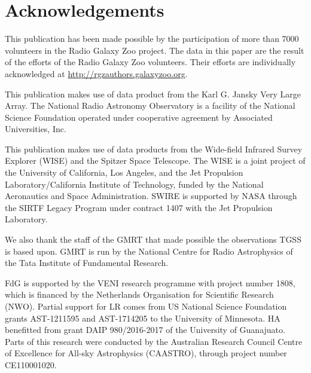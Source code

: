 \documentclass[fleqn,usenatbib]{mnras}
\begin{document}





\section*{Acknowledgements}

This publication has been made possible by the participation of more than 7000 volunteers in the Radio Galaxy Zoo project.  The data in this paper are the result of the efforts of
the Radio Galaxy Zoo volunteers.
Their efforts are individually acknowledged at {\url{http://rgzauthors.galaxyzoo.org}}. 


This publication makes use of data product from the Karl G. Jansky Very Large Array. The National Radio Astronomy Observatory is a facility of the National Science Foundation operated under cooperative agreement by Associated Universities, Inc.

This publication makes use of data products from the Wide-field
Infrared Survey Explorer (WISE) and the Spitzer Space Telescope. The WISE is a joint project of the University of California, Los Angeles, and the Jet Propulsion Laboratory/California Institute of Technology, funded by the National Aeronautics and Space Administration. SWIRE is supported by NASA through the SIRTF Legacy Program under contract 1407 with the Jet Propulsion Laboratory. 

We also thank the staff of the GMRT that made possible the observations TGSS is based upon. GMRT is run by the National Centre for Radio Astrophysics of the Tata Institute of Fundamental Research.

FdG is supported by the VENI research programme with project number 1808, which is financed by the Netherlands Organisation for Scientific Research (NWO). Partial support for LR comes from US National Science Foundation grants AST-1211595 and AST-1714205 to the University of Minnesota. HA benefitted from grant DAIP 980/2016-2017 of the University of Guanajuato. Parts of this research were conducted by the Australian Research Council Centre of Excellence for All-sky Astrophysics (CAASTRO), through project number CE110001020.














\appendix





\bsp	%
\label{lastpage}
\end{document}
